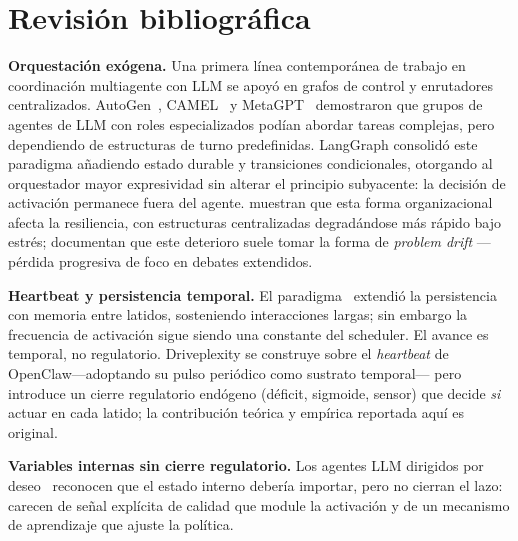 \documentclass{llncs}
\begin{document}
\section{Revisi\'on bibliogr\'afica}
\label{sec:related}

\textbf{Orquestaci\'on ex\'ogena.}
Una primera l\'inea contempor\'anea de trabajo en coordinaci\'on multiagente con LLM se
apoy\'o en grafos de control y enrutadores centralizados.
AutoGen~\parencite{wu2023autogen}, CAMEL~\parencite{li2023camel} y
MetaGPT~\parencite{hong2023metagpt} demostraron que grupos de agentes de LLM con
roles especializados pod\'ian abordar tareas complejas, pero dependiendo de
estructuras de turno predefinidas. LangGraph consolid\'o este paradigma
a\~nadiendo estado durable y transiciones condicionales, otorgando al
orquestador mayor expresividad sin alterar el principio subyacente: la
decisi\'on de activaci\'on permanece fuera del agente.
\textcite{huang2024masresilience} muestran que esta forma organizacional
afecta la resiliencia, con estructuras centralizadas degrad\'andose m\'as
r\'apido bajo estr\'es; \textcite{becker2025problemdrift} documentan
que este deterioro suele tomar la forma de \emph{problem drift}
---p\'erdida progresiva de foco en debates extendidos.

\textbf{Heartbeat y persistencia temporal.} El
paradigma~\parencite{openclaw2025heartbeat} extendi\'o la persistencia
con memoria entre latidos, sosteniendo interacciones largas; sin embargo
la frecuencia de activaci\'on sigue siendo una constante del scheduler.
El avance es temporal, no regulatorio. Driveplexity se construye sobre el
\emph{heartbeat} de OpenClaw---adoptando su pulso peri\'odico como
sustrato temporal--- pero introduce un cierre regulatorio end\'ogeno
(d\'eficit, sigmoide, sensor) que decide \emph{si} actuar en cada
latido; la contribuci\'on te\'orica y emp\'irica reportada aqu\'i es
original.

\textbf{Variables internas sin cierre regulatorio.}
Los agentes LLM dirigidos por deseo~\parencite{wang2025d2a} reconocen
que el estado interno deber\'ia importar, pero no cierran el lazo:
carecen de se\~nal expl\'icita de calidad que module la activaci\'on y
de un mecanismo de aprendizaje que ajuste la pol\'itica.
\end{document}
